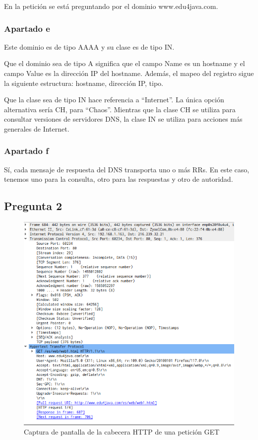 \documentclass[spanish]{report} %
\begin{document}
En la petición se está preguntando por el dominio www.edu4java.com.

\subsubsection{Apartado e}

Este dominio es de tipo AAAA y su clase es de tipo IN.\newline

Que el dominio sea de tipo A significa que el campo Name es un hostname y el
campo Value es la dirección IP del hostname. Además, el mapeo del registro
sigue la siguiente estructura: hostname, dirección IP, tipo.\newline

Que la clase sea de tipo IN hace referencia a ``Internet''. La única opción
alternativa sería CH, para ``Chaos''. Mientras que la clase CH se utiliza para
consultar versiones de servidores DNS, la clase IN se utiliza para acciones más
generales de Internet. 

\subsubsection{Apartado f}

Sí, cada mensaje de respuesta del DNS transporta uno o más RRs. En este caso,
tenemos uno para la consulta, otro para las respuestas y otro de autoridad.

\newpage

\subsection{Pregunta 2}

\begin{figure}[h]
\begin{center}
\includegraphics[scale=.4]{../img/9.png}
\end{center}
\caption{Captura de pantalla de la cabecera HTTP de una petición GET}
\end{figure}
\end{document}
